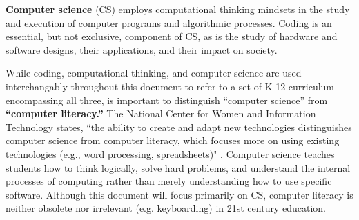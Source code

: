 \textbf{Computer science} (CS) employs computational thinking mindsets in the study and execution of computer programs and algorithmic processes. Coding is an essential, but not exclusive, component of CS, as is the study of hardware and software designs, their applications, and their impact on society. \par
While coding, computational thinking, and computer science are used interchangably throughout this document to refer to a set of K-12 curriculum encompassing all three, is important to distinguish ``computer science'' from \textbf{``computer literacy.''} The National Center for Women and Information Technology states, ``the ability to create and adapt new technologies distinguishes computer science from computer literacy, which focuses more on using existing technologies (e.g., word processing, spreadsheets)" \cite{wit}. Computer science teaches students how to think logically, solve hard problems, and understand the internal processes of computing rather than merely understanding how to use specific software. Although this document will focus primarily on CS, computer literacy is neither obsolete nor irrelevant (e.g. keyboarding) in 21st century education. \par  


